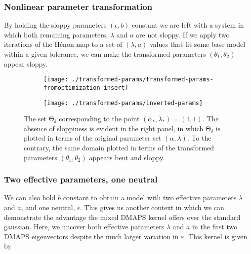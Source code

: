 \documentclass[11pt]{article}
\newcommand{\ps}{\mathrm{\Theta}}
\newcommand{\p}{\theta}
\newcommand{\eps}{\varepsilon}
\begin{document}
\subsubsection{Nonlinear parameter transformation}

By holding the sloppy parameters $(\epsilon, b)$ constant we are left
with a system in which both remaining parameters, $\lambda$ and $a$
are not sloppy. If we apply two iterations of the H\'{e}non map to a
set of $(\lambda, a)$ values that fit some base model within a given
tolerance, we can make the transformed parameters $(\theta_1,
\theta_2)$ appear sloppy.

\begin{figure}[ht!]
  \begin{subfigure}[t]{0.49\textwidth}
    \centering
    \texttt{[image: ./transformed-params/transformed-params-fromoptimization-insert]}
  \end{subfigure}
  \begin{subfigure}[t]{0.49\textwidth}
    \centering
    \texttt{[image: ./transformed-params/inverted-params]}
  \end{subfigure} %
  \caption{The set $\ps_\delta$ corresponding to the point
    $(\alpha_*,\lambda_*) = (1,1)$. The absence of
    sloppiness is evident in the right panel, in which $\ps_\delta$ is
    plotted in terms of the original parameter set
    $(\alpha,\lambda)$. To the contrary, the same domain plotted in
    terms of the transformed parameters $(\p_1,\p_2)$ appears bent and
    sloppy. \label{f.transf-params}}
\end{figure}

\subsubsection{Two effective parameters, one neutral}

We can also hold $b$ constant to obtain a model with two effective
parameters $\lambda$ and $a$, and one neutral, $\epsilon$. This gives
us another context in which we can demonstrate the advantage the mixed DMAPS
kernel offers over the standard gaussian. Here, we uncover both
effective parameters $\lambda$ and $a$ in the first two DMAPS
eigenvectors despite the much larger variation in $\eps$. This kernel
is given by
\end{document}
